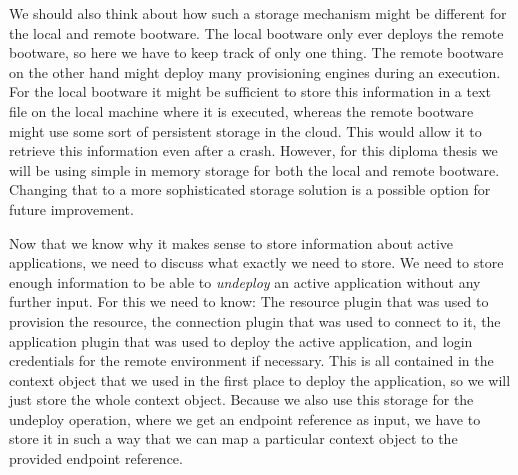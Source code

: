 We should also think about how such a storage mechanism might be different for the local and remote bootware.
The local bootware only ever deploys the remote bootware, so here we have to keep track of only one thing.
The remote bootware on the other hand might deploy many provisioning engines during an execution.
For the local bootware it might be sufficient to store this information in a text file on the local machine where it is executed, whereas the remote bootware might use some sort of persistent storage in the cloud.
This would allow it to retrieve this information even after a crash.
However, for this diploma thesis we will be using simple in memory storage for both the local and remote bootware.
Changing that to a more sophisticated storage solution is a possible option for future improvement.

Now that we know why it makes sense to store information about active applications, we need to discuss what exactly we need to store.
We need to store enough information to be able to \textit{undeploy} an active application without any further input.
For this we need to know: The resource plugin that was used to provision the resource, the connection plugin that was used to connect to it, the application plugin that was used to deploy the active application, and login credentials for the remote environment if necessary.
This is all contained in the context object that we used in the first place to deploy the application, so we will just store the whole context object.
Because we also use this storage for the undeploy operation, where we get an endpoint reference as input, we have to store it in such a way that we can map a particular context object to the provided endpoint reference.
